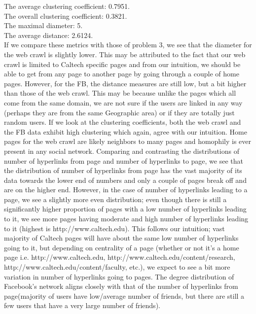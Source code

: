 \documentclass[12 pt]{article}
\begin{document}
	\noindent The average clustering coefficient: 0.7951. \\
	\noindent The overall clustering coefficient: 0.3821. \\
	\noindent The maximal diameter: 5. \\
	\noindent The average distance: 2.6124. \\
	
	\noindent If we compare these metrics with those of problem 3, we see that the diameter for the web crawl is slightly lower. This may be attributed to the fact that our web crawl is limited to Caltech specific pages and from our intuition, we should be able to get from any page to another page by going through a couple of home pages. However, for the FB, the distance measures are still low, but a bit higher than those of the web crawl. This may be because unlike the pages which all come from the same domain, we are not sure if the users are linked in any way (perhaps they are from the same Geographic area) or if they are totally just random users. If we look at the clustering coefficients, both the web crawl and the FB data exhibit high clustering which again, agree with our intuition. Home pages for the web crawl are likely neighbors to many pages and homophily is ever present in any social network. Comparing and contrasting the distributions of number of hyperlinks from page and number of hyperlinks to page, we see that the distribution of number of hyperlinks from page has the vast majority of its data towards the lower end of numbers and only a couple of pages break off and are on the higher end. However, in the case of number of hyperlinks leading to a page, we see a slightly more even distribution; even though there is still a significantly higher proportion of pages with a low number of hyperlinks leading to it, we see more pages having moderate and high number of hyperlinks leading to it (highest is http://www.caltech.edu). This follows our intuition; vast majority of Caltech pages will have about the same low number of hyperlinks going to it, but depending on centrality of a page (whether or not it's a home page i.e. http://www.caltech.edu, http://www.caltech.edu/content/research,  http://www.caltech.edu/content/faculty, etc.), we expect to see a bit more variation in number of hyperlinks going to pages. The degree distribution of Facebook's network aligns closely with that of the number of hyperlinks from page(majority of users have low/average number of friends, but there are still a few users that have a very large number of friends). \\
	
\end{document}
